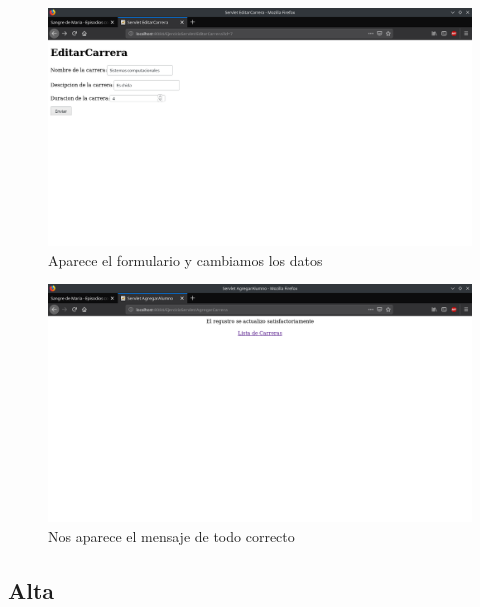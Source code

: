 \documentclass[a4paper,12pt]{article}
\begin{document}
\begin{figure}[H]
\begin{center}
 \includegraphics[width=\textwidth]{img/editar2.png}
 \caption{Aparece el formulario y cambiamos los datos}
 \label{fig:editar2}
\end{center}
\end{figure}

\begin{figure}[H]
\begin{center}
 \includegraphics[width=\textwidth]{img/editar3.png}
 \caption{Nos aparece el mensaje de todo correcto}
 \label{fig:editar3}
\end{center}
\end{figure}

\subsection{Alta}
\end{document}
